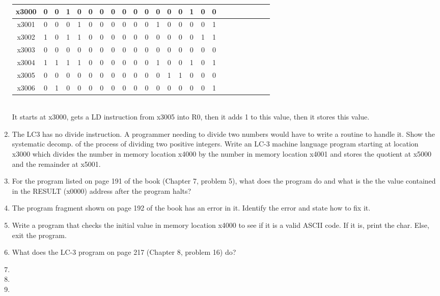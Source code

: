 \documentclass[a4paper,11pt]{article}
\begin{document}
\begin{enumerate}
\begin{tabular}{| c || c | c | c | c | c | c | c | c | c | c | c | c | c | c | c | c | c | c | c | c | c | c | c |} \hline 
x3000 & 0 & 0 & 1 & 0 & 0 & 0 & 0 & 0 &0 & 0 & 0 & 0 & 0 & 1 & 0 & 0 \\ \hline
x3001 & 0 & 0 & 0 & 1 & 0 & 0 & 0 & 0 & 0 & 0 & 1 & 0 & 0 & 0 & 0 & 1 \\ \hline
x3002 & 1 & 0 & 1 & 1 & 0 & 0 & 0 & 0 & 0 & 0 & 0 & 0 & 0 & 0 & 1 & 1 \\ \hline
x3003 & 0 & 0 & 0 & 0 & 0 & 0 & 0 & 0 & 0 & 0 & 0 & 0 & 0 & 0 & 0 & 0 \\ \hline
x3004 & 1 & 1 & 1 & 1 & 0 & 0 & 0 & 0 & 0 & 0 & 1 & 0 & 0 & 1 & 0 & 1 \\ \hline
x3005 & 0 & 0 & 0 & 0 & 0 & 0 & 0 & 0 & 0 & 0 & 0 & 1 & 1 & 0 & 0 & 0 \\ \hline
x3006 & 0 & 1 & 0 & 0 & 0 & 0 & 0 & 0 & 0 & 0 & 0 & 0 & 0 & 0 & 0 & 1 \\ \hline
\end{tabular} \\
It starts at x3000, gets a LD instruction from x3005 into R0, then it adds 1 to this value, then it stores this value. 

\item The LC3 has no divide instruction. A programmer needing to divide two numbers would have to write a routine to handle it. Show the systematic decomp. of the process of dividing two positive integers. Write an LC-3 machine language program starting at location x3000 which divides the number in memory location x4000 by the number in memory location x4001 and stores the quotient at x5000 and the remainder at x5001.

\item For the program listed on page 191 of the book (Chapter 7, problem 5), what does the program do and what is the the value contained in the RESULT (x0000) address after the program halts?


\item The program fragment shown on page 192 of the book has an error in it. Identify the error and state how to fix it.

\item Write a program that checks the initial value in memory location x4000 to see if it is a valid ASCII code. If it is, print the char. Else, exit the program.

\item What does the LC-3 program on page 217 (Chapter 8, problem 16) do?

\item 

\item

\item
\end{enumerate}
\end{document}

